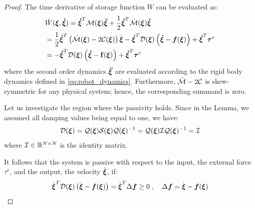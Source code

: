 \begin{proof}
The time derivative of storage function $W$ can be evaluated as:
\begin{align}
	& \dot W(\boldsymbol{\xi}, \boldsymbol{\dot \xi}) =
    \boldsymbol{\dot \xi}^T \mathcal{M}(\boldsymbol{\xi}) \boldsymbol{\ddot \xi}  + \frac{1}{2} \boldsymbol{\dot \xi}^T \dot{\mathcal{M}}(\boldsymbol{\xi}) \boldsymbol{\dot \xi}  \nonumber \\
  &= \frac{1}{2} \boldsymbol{\dot \xi}^T \left( \dot{\mathcal{M}}(\boldsymbol{\xi}) - 2 \mathcal{C}(\boldsymbol{\xi}) \right) \dot{\boldsymbol{\xi}} - \boldsymbol{\dot \xi}^T \mathcal{D}(\boldsymbol{\xi}) \left(\boldsymbol{\dot \xi} - \boldsymbol{f}(\boldsymbol{\xi}) \right) + \boldsymbol{\dot \xi}^T \boldsymbol{\tau}^e \nonumber \\
  &= - \boldsymbol{\dot \xi}^T \mathcal{D}(\boldsymbol{\xi}) \left( \boldsymbol{\dot\xi} - \mathbf{f}(\boldsymbol{\xi}) \right) + \boldsymbol{\dot\xi}^T \boldsymbol{\tau}^e
\end{align}
where the second order dynamics $\boldsymbol{\ddot \xi}$ are evaluated according to the rigid body dynamics defined in \eqref{eq:robot_dynamics}. Furthermore, $\dot{\mathcal{M}} - 2 \mathcal{C}$ is skew-symmetric for any physical system; hence, the corresponding summand is zero.

Let us investigate the region where the passivity holds. Since in the Lemma, we assumed all damping values being equal to one, we have:
\begin{equation}
	\mathcal{D}({\boldsymbol{\xi}}) = \mathcal{Q}({\boldsymbol{\xi}}) \mathcal{S} ({\boldsymbol{\xi}}) \mathcal{Q}({\boldsymbol{\xi}})^{-1}= \mathcal{Q}({\boldsymbol{\xi}}) \mathcal{I} \mathcal{Q}({\boldsymbol{\xi}})^{-1} = \mathcal{I}
\end{equation}
where $\mathcal{I} \in \mathbb{R}^{N \times N}$ is the identity matrix.

It follows that the system is passive with respect to the input, the external force $\tau^e$, and the output, the velocity $\dot {\boldsymbol{\xi}}$, if: 
\begin{equation}
	\dot{\boldsymbol {\vecs \xi}}^T \matd{D}({\vecs \xi}) \left(\dot{\boldsymbol {\vecs \xi}} - \boldsymbol{f}(\boldsymbol {\vecs \xi}) \right) = 
    \dot{{\vecs \xi}} ^ T \Delta \vect{f}  \geq 0 
 \; , \quad
 \Delta \vect{f} = \dot{{\vecs \xi}} - \vect{f}({\vecs \xi})
 \label{eq:passivity_condition}
\end{equation}


\end{proof}
